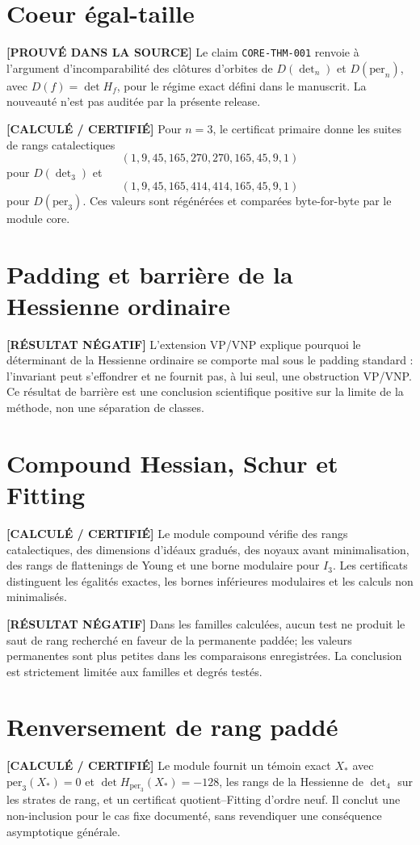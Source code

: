 \documentclass[10pt]{article}
\newcommand{\proved}{\textcolor{proved}{\textbf{[PROUVÉ DANS LA SOURCE]}}}
\newcommand{\computed}{\textcolor{computed}{\textbf{[CALCULÉ / CERTIFIÉ]}}}
\newcommand{\negative}{\textcolor{negative}{\textbf{[RÉSULTAT NÉGATIF]}}}
\begin{document}
\section{Coeur égal-taille}
\proved{} Le claim \texttt{CORE-THM-001} renvoie à l'argument d'incomparabilité des clôtures d'orbites de $D(\det_n)$ et $D(\mathrm{per}_n)$, avec $D(f)=\det H_f$, pour le régime exact défini dans le manuscrit. La nouveauté n'est pas auditée par la présente release.

\computed{} Pour $n=3$, le certificat primaire donne les suites de rangs catalectiques
\[
(1,9,45,165,270,270,165,45,9,1)
\]
pour $D(\det_3)$ et
\[
(1,9,45,165,414,414,165,45,9,1)
\]
pour $D(\mathrm{per}_3)$. Ces valeurs sont régénérées et comparées byte-for-byte par le module core.

\section{Padding et barrière de la Hessienne ordinaire}
\negative{} L'extension VP/VNP explique pourquoi le déterminant de la Hessienne ordinaire se comporte mal sous le padding standard : l'invariant peut s'effondrer et ne fournit pas, à lui seul, une obstruction VP/VNP. Ce résultat de barrière est une conclusion scientifique positive sur la limite de la méthode, non une séparation de classes.

\section{Compound Hessian, Schur et Fitting}
\computed{} Le module compound vérifie des rangs catalectiques, des dimensions d'idéaux gradués, des noyaux avant minimalisation, des rangs de flattenings de Young et une borne modulaire pour $I_3$. Les certificats distinguent les égalités exactes, les bornes inférieures modulaires et les calculs non minimalisés.

\negative{} Dans les familles calculées, aucun test ne produit le saut de rang recherché en faveur de la permanente paddée; les valeurs permanentes sont plus petites dans les comparaisons enregistrées. La conclusion est strictement limitée aux familles et degrés testés.

\section{Renversement de rang paddé}
\computed{} Le module fournit un témoin exact $X_*$ avec $\mathrm{per}_3(X_*)=0$ et $\det H_{\mathrm{per}_3}(X_*)=-128$, les rangs de la Hessienne de $\det_4$ sur les strates de rang, et un certificat quotient--Fitting d'ordre neuf. Il conclut une non-inclusion pour le cas fixe documenté, sans revendiquer une conséquence asymptotique générale.
\end{document}
